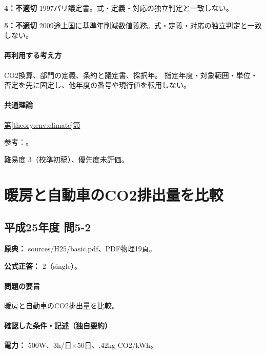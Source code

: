 \noindent\textbf{4：不適切} 1997パリ議定書。式・定義・対応の独立判定と一致しない。\par

\noindent\textbf{5：不適切} 2009途上国に基準年削減数値義務。式・定義・対応の独立判定と一致しない。\par

\paragraph{再利用する考え方} CO2換算、部門の定義、条約と議定書、採択年。 指定年度・対象範囲・単位・否定を先に固定し、他年度の番号や現行値を転用しない。

\paragraph{共通理論} \hyperref[theory:env:climate]{第\ref*{theory:env:climate}節}

\par 参考：\cite{env58_ghg2008}。

\par 難易度 3（校準初稿）、優先度未評価。

\section{暖房と自動車のCO2排出量を比較}

\subsection{平成25年度 問5-2}
\label{q:h25-reg-basic-5-2}

\noindent\textbf{原典：} sources/H25/basic.pdf、PDF物理19頁。

\textbf{公式正答：} 2（single）。

\paragraph{問題の要旨} 暖房と自動車のCO2排出量を比較。

\paragraph{確認した条件・記述（独自要約）}\mbox{}\par

\noindent\textbf{電力：} 500W、3h/日×50日、.42kg-CO2/kWh。\par

